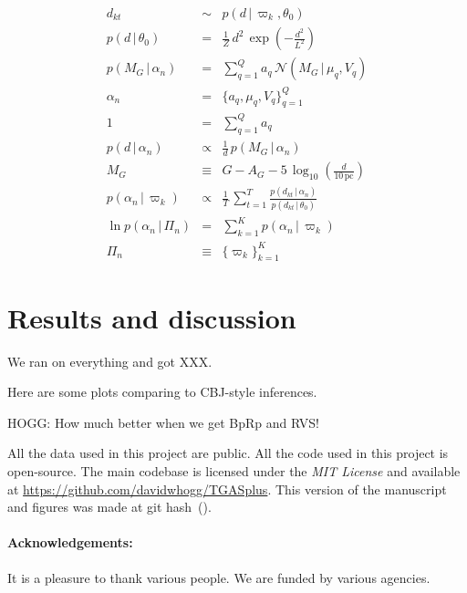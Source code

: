 \documentclass[12pt]{article}
\newcommand{\project}[1]{\textsl{#1}}
\newcommand{\acronym}[1]{\small{#1}}
\newcommand{\given}{\,|\,}
\newcommand{\normal}{\mathcal{N}}
\newcommand{\setof}[1]{\{{#1}\}}
\newcommand{\pc}{\mathrm{pc}}
\begin{document}
\begin{eqnarray}
  d_{kt} &\sim& p(d\given\varpi_k,\theta_0)
  \\
  p(d\given\theta_0) &=& \frac{1}{Z}\,d^2\,\exp(-\frac{d^2}{L^2})
  \\
  p(M_G\given\alpha_n) &=& \sum_{q=1}^Q a_q\,\normal(M_G\given\mu_q,V_q)
  \\
  \alpha_n &=& \setof{a_q, \mu_q, V_q}_{q=1}^Q
  \\
  1 &=& \sum_{q=1}^Q a_q
  \\
  p(d\given\alpha_n) &\propto& \frac{1}{d}\,p(M_G\given\alpha_n)
  \\
  M_G &\equiv& G - A_G - 5\,\log_{10}(\frac{d}{10\,\pc})
  \\
  p(\alpha_n\given\varpi_k) &\propto& \frac{1}{T}\,\sum_{t=1}^T \frac{p(d_{kt}\given\alpha_n)}{p(d_{kt}\given\theta_0)}
  \\
  \ln p(\alpha_n\given\Pi_n) &=& \sum_{k=1}^K p(\alpha_n\given\varpi_k)
  \\
  \Pi_n &\equiv& \setof{\varpi_k}_{k=1}^K
\end{eqnarray}

\section{Results and discussion}
We ran on everything and got XXX.

Here are some plots comparing to CBJ-style inferences.

HOGG: How much better when we get BpRp and RVS!

All the data used in this project are public. All the code used in
this project is open-source. The main codebase is licensed under the
\project{\acronym{MIT} License} and available at
\url{https://github.com/davidwhogg/TGASplus}. This version of the
manuscript and figures was made at git hash
\textsf{\githash\,(\gitdate)}.

\paragraph{Acknowledgements:}
It is a pleasure to thank various people.
We are funded by various agencies.
\end{document}
